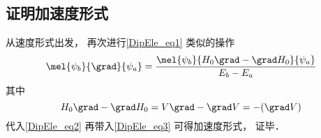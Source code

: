 \subsection{证明加速度形式}
从速度形式出发， 再次进行\autoref{DipEle_eq1} 类似的操作
\begin{equation}\label{DipEle_eq2}
\mel{\psi_b}{\grad}{\psi_a} = \frac{\mel{\psi_b}{H_0\grad - \grad H_0}{\psi_a}}{E_b - E_a}
\end{equation}
其中
\begin{equation}
H_0\grad - \grad H_0 = V\grad - \grad V = -(\grad V)
\end{equation}
代入\autoref{DipEle_eq2} 再带入\autoref{DipEle_eq3} 可得加速度形式， 证毕．
